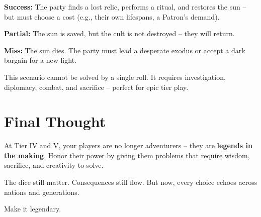 \textbf{Success:} The party finds a lost relic, performs a ritual, and restores the sun -- but must choose a cost (e.g., their own lifespans, a Patron's demand).

\textbf{Partial:} The sun is saved, but the cult is not destroyed -- they will return.

\textbf{Miss:} The sun dies. The party must lead a desperate exodus or accept a dark bargain for a new light.

This scenario cannot be solved by a single roll. It requires investigation, diplomacy, combat, and sacrifice -- perfect for epic tier play.

\section{Final Thought}

At Tier IV and V, your players are no longer adventurers -- they are \textbf{legends in the making}. Honor their power by giving them problems that require wisdom, sacrifice, and creativity to solve.

The dice still matter. Consequences still flow. But now, every choice echoes across nations and generations.

Make it legendary.